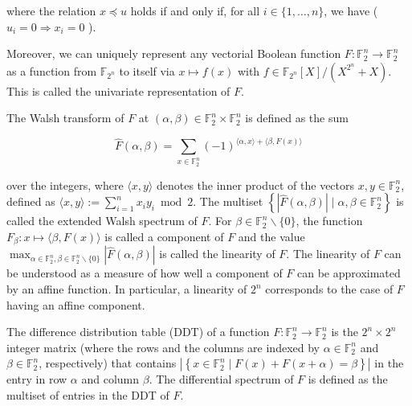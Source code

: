 \documentclass[10pt]{article}
\begin{document}
where the relation $x \preceq u$ holds if and only if, for all $i \in\{1, \ldots, n\}$, we have ( $u_{i}=0 \Rightarrow x_{i}=0$ ).

Moreover, we can uniquely represent any vectorial Boolean function $F: \mathbb{F}_{2}^{n} \rightarrow \mathbb{F}_{2}^{n}$ as a function from $\mathbb{F}_{2^{n}}$ to itself via $x \mapsto f(x)$ with $f \in \mathbb{F}_{2^{n}}[X] /\left(X^{2^{n}}+X\right)$. This is called the univariate representation of $F$.

The Walsh transform of $F$ at $(\alpha, \beta) \in \mathbb{F}_{2}^{n} \times \mathbb{F}_{2}^{n}$ is defined as the sum

$$
\widehat{F}(\alpha, \beta)=\sum_{x \in \mathbb{F}_{2}^{n}}(-1)^{\langle\alpha, x\rangle+\langle\beta, F(x)\rangle}
$$

over the integers, where $\langle x, y\rangle$ denotes the inner product of the vectors $x, y \in \mathbb{F}_{2}^{n}$, defined as $\langle x, y\rangle:=\sum_{i=1}^{n} x_{i} y_{i} \bmod 2$. The multiset $\left\{|\widehat{F}(\alpha, \beta)| \mid \alpha, \beta \in \mathbb{F}_{2}^{n}\right\}$ is called the extended Walsh spectrum of $F$. For $\beta \in \mathbb{F}_{2}^{n} \backslash\{0\}$, the function $F_{\beta}: x \mapsto\langle\beta, F(x)\rangle$ is called a component of $F$ and the value $\max _{\alpha \in \mathbb{F}_{2}^{n}, \beta \in \mathbb{F}_{2}^{n} \backslash\{0\}}|\widehat{F}(\alpha, \beta)|$ is called the linearity of $F$. The linearity of $F$ can be understood as a measure of how well a component of $F$ can be approximated by an affine function. In particular, a linearity of $2^{n}$ corresponds to the case of $F$ having an affine component.

The difference distribution table (DDT) of a function $F: \mathbb{F}_{2}^{n} \rightarrow \mathbb{F}_{2}^{n}$ is the $2^{n} \times 2^{n}$ integer matrix (where the rows and the columns are indexed by $\alpha \in \mathbb{F}_{2}^{n}$ and $\beta \in \mathbb{F}_{2}^{n}$, respectively) that contains $\left|\left\{x \in \mathbb{F}_{2}^{n} \mid F(x)+F(x+\alpha)=\beta\right\}\right|$ in the entry in row $\alpha$ and column $\beta$. The differential spectrum of $F$ is defined as the multiset of entries in the DDT of $F$.
\end{document}
